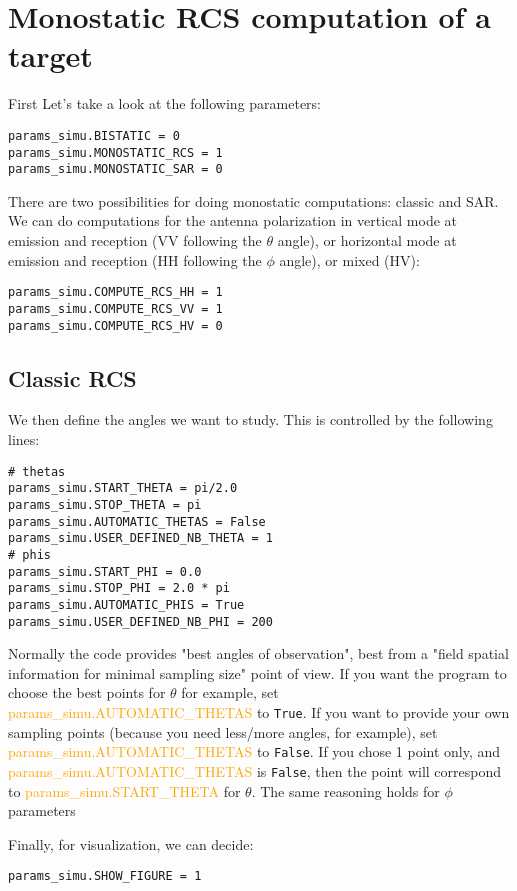 \documentclass[a4paper,10pt]{book}
\newcommand{\parameter}[1] {\textcolor{orange}{\textsf{#1}}}
\begin{document}
\section{Monostatic RCS computation of a target}
%
\par
First Let's take a look at the following parameters:
\begin{verbatim}
params_simu.BISTATIC = 0
params_simu.MONOSTATIC_RCS = 1
params_simu.MONOSTATIC_SAR = 0
\end{verbatim}
There are two possibilities for doing monostatic computations: classic and SAR. We can do computations for the antenna polarization in vertical mode at emission and reception (VV following the $\theta$ angle), or horizontal mode at emission and reception (HH following the $\phi$ angle), or mixed (HV):
\begin{verbatim}
params_simu.COMPUTE_RCS_HH = 1
params_simu.COMPUTE_RCS_VV = 1
params_simu.COMPUTE_RCS_HV = 0
\end{verbatim}

\subsection{Classic RCS}
%
\par
We then define the angles we want to study. This is controlled by the following lines:
\begin{verbatim}
# thetas
params_simu.START_THETA = pi/2.0
params_simu.STOP_THETA = pi
params_simu.AUTOMATIC_THETAS = False
params_simu.USER_DEFINED_NB_THETA = 1
# phis
params_simu.START_PHI = 0.0
params_simu.STOP_PHI = 2.0 * pi
params_simu.AUTOMATIC_PHIS = True
params_simu.USER_DEFINED_NB_PHI = 200
\end{verbatim}
%
\par
Normally the code provides "best angles of observation", best from a "field spatial information for minimal sampling size" point of view. If you want the program to choose the best points for $\theta$ for example, set \parameter{params\_simu.AUTOMATIC\_THETAS} to \texttt{True}. If you want to provide your own sampling points (because you need less/more angles, for example), set \parameter{params\_simu.AUTOMATIC\_THETAS} to \texttt{False}. If you chose 1 point only, and \parameter{params\_simu.AUTOMATIC\_THETAS} is \texttt{False}, then the point will correspond to \parameter{params\_simu.START\_THETA} for $\theta$. The same reasoning holds for $\phi$ parameters
%
\par
Finally, for visualization, we can decide:
\begin{verbatim}
params_simu.SHOW_FIGURE = 1
\end{verbatim}
\end{document}
